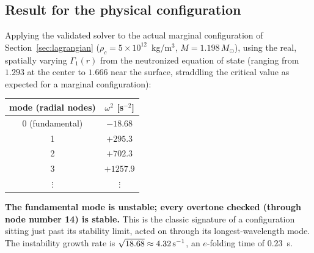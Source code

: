 \documentclass[11pt]{article}
\begin{document}
\subsection{Result for the physical configuration}

Applying the validated solver to the actual marginal configuration of Section~\ref{sec:lagrangian} ($\rho_c=5\times10^{12}$~kg/m$^3$, $M=1.198\,M_\odot$), using the real, spatially varying $\Gamma_1(r)$ from the neutronized equation of state (ranging from $1.293$ at the center to $1.666$ near the surface, straddling the critical value as expected for a marginal configuration):

\begin{center}
\begin{tabular}{cc}
\hline
mode (radial nodes) & $\omega^2$ [s$^{-2}$] \\
\hline
0 (fundamental) & $-18.68$ \\
1 & $+295.3$ \\
2 & $+702.3$ \\
3 & $+1257.9$ \\
$\vdots$ & $\vdots$ \\
\hline
\end{tabular}
\end{center}

\textbf{The fundamental mode is unstable; every overtone checked (through node number 14) is stable.} This is the classic signature of a configuration sitting just past its stability limit, acted on through its longest-wavelength mode. The instability growth rate is $\sqrt{18.68}\approx4.32\,{\rm s}^{-1}$, an $e$-folding time of $0.23$~s.
\end{document}
